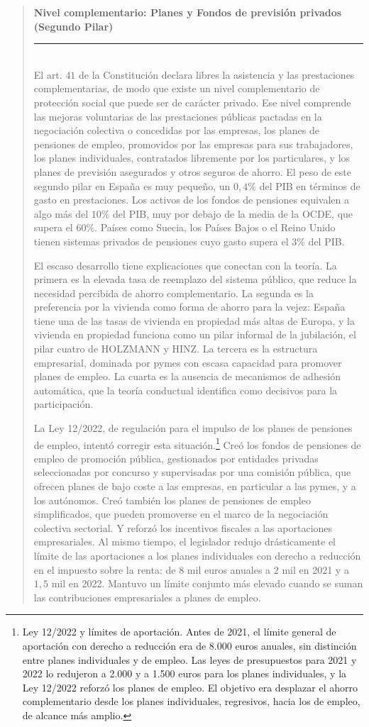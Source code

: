 \documentclass[10pt,a4paper]{article}
\newenvironment{specialblock}[1]{%
      \begin{quote} %
      \small %
      \noindent\textbf{#1}\\[-0.3em] %
      \rule{\linewidth}{0.4pt}\\[0.6em]}{
      \end{quote}}
\begin{document}
\begin{specialblock}{\textbf{Nivel complementario}: Planes y Fondos de previsión privados (Segundo Pilar)}
    El art. $41$ de la Constitución declara libres la asistencia y las prestaciones complementarias, de modo que existe un nivel complementario de protección social que puede ser de carácter privado. Ese nivel comprende las mejoras voluntarias de las prestaciones públicas pactadas en la negociación colectiva o concedidas por las empresas, los planes de pensiones de empleo, promovidos por las empresas para sus trabajadores, los planes individuales, contratados libremente por los particulares, y los planes de previsión asegurados y otros seguros de ahorro. El peso de este segundo pilar en España es muy pequeño, un $0,4\%$ del PIB en términos de gasto en prestaciones. Los activos de los fondos de pensiones equivalen a algo más del $10\%$ del PIB, muy por debajo de la media de la OCDE, que supera el $60\%$. Países como Suecia, los Países Bajos o el Reino Unido tienen sistemas privados de pensiones cuyo gasto supera el $3\%$ del PIB.

    El escaso desarrollo tiene explicaciones que conectan con la teoría. La primera es la elevada tasa de reemplazo del sistema público, que reduce la necesidad percibida de ahorro complementario. La segunda es la preferencia por la vivienda como forma de ahorro para la vejez: España tiene una de las tasas de vivienda en propiedad más altas de Europa, y la vivienda en propiedad funciona como un pilar informal de la jubilación, el pilar cuatro de HOLZMANN y HINZ. La tercera es la estructura empresarial, dominada por pymes con escasa capacidad para promover planes de empleo. La cuarta es la ausencia de mecanismos de adhesión automática, que la teoría conductual identifica como decisivos para la participación.
    
    La Ley 12/2022, de regulación para el impulso de los planes de pensiones de empleo, intentó corregir esta situación.\footnote{%
        Ley 12/2022 y límites de aportación. Antes de 2021, el límite general de aportación con derecho a reducción era de 8.000 euros anuales, sin distinción entre planes individuales y de empleo. Las leyes de presupuestos para 2021 y 2022 lo redujeron a 2.000 y a 1.500 euros para los planes individuales, y la Ley 12/2022 reforzó los planes de empleo. El objetivo era desplazar el ahorro complementario desde los planes individuales, regresivos, hacia los de empleo, de alcance más amplio.
    } Creó los fondos de pensiones de empleo de promoción pública, gestionados por entidades privadas seleccionadas por concurso y supervisadas por una comisión pública, que ofrecen planes de bajo coste a las empresas, en particular a las pymes, y a los autónomos. Creó también los planes de pensiones de empleo simplificados, que pueden promoverse en el marco de la negociación colectiva sectorial. Y reforzó los incentivos fiscales a las aportaciones empresariales. Al mismo tiempo, el legislador redujo drásticamente el límite de las aportaciones a los planes individuales con derecho a reducción en el impuesto sobre la renta: de $8$ mil euros anuales a $2$ mil en 2021 y a $1,5$ mil en 2022. Mantuvo un límite conjunto más elevado cuando se suman las contribuciones empresariales a planes de empleo.
    

\end{specialblock}
\end{document}

